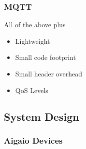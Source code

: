 \begin{frame}
\frametitle{MQTT}

All of the above plus
\begin{itemize}
\item Lightweight
\item Small code footprint
\item Small header overhead
\item QoS Levels
\end{itemize}

\begin{figure}[!htb]
\centering
{}
\end{figure}

\end{frame}


\subsection{System Design}

\begin{frame}
\frametitle{Aigaio Devices}
\end{frame}

